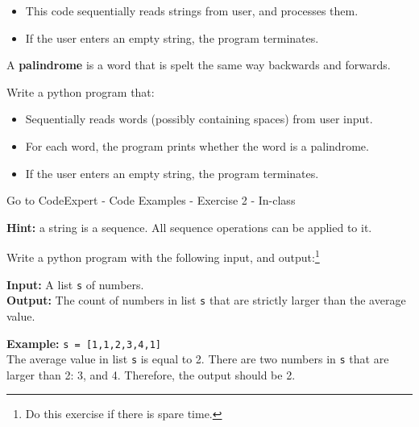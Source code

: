 \documentclass[12pt,c, german, aspectratio=169]{beamer} %
\begin{document}
\begin{frame}[fragile]{}
\begin{itemize}
    \item This code sequentially reads strings from user, and processes them.
    \item If the user enters an empty string, the program terminates.
\end{itemize}

\end{frame}


\begin{frame}[fragile]{}

A \textbf{palindrome} is a word that is spelt the same way backwards and forwards.
\vspace{0.5cm}

Write a python program that: 
\begin{itemize}
    \item Sequentially reads words (possibly containing spaces) from user input.
    \item For each word, the program prints whether the word is a palindrome.
    \item If the user enters an empty string, the program terminates.
\end{itemize}
Go to CodeExpert - Code Examples - Exercise 2 - In-class
\vspace{0.5cm}

\textbf{Hint:} a string is a sequence. All sequence operations can be applied to it.

\end{frame}

\begin{frame}[fragile]{}
Write a python program with the following input, and output:\footnote{Do this exercise if there is spare time.}

\textbf{Input:} A list \texttt{s} of numbers.\\
\textbf{Output:} The count of numbers in list \texttt{s} that are strictly larger than the average value.

\vspace{0.2cm}
\textbf{Example:}
\texttt{s = [1,1,2,3,4,1]}\\
The average value in list \texttt{s} is equal to 2. There are two numbers in \texttt{s} that are larger than 2: 3, and 4. Therefore, the output should be 2.

\end{frame}
\end{document}
